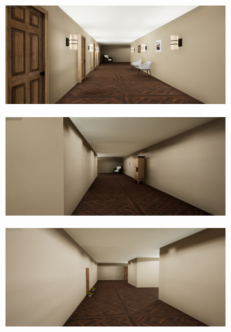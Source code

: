 \begin{figure}[H]
    \centering
    \begin{subfigure}[b]{0.48\textwidth}
        \centering
        \includegraphics[width=\textwidth]{resources/png/03/indoor-staircase/1.png}
        \vspace{0.25em}
    \end{subfigure}
    \hfill
    \begin{subfigure}[b]{0.48\textwidth}
        \centering
        \includegraphics[width=\textwidth]{resources/png/03/indoor-staircase/2.png}
        \vspace{0.25em}
    \end{subfigure}
    \begin{subfigure}[b]{0.48\textwidth}
        \centering
        \includegraphics[width=\textwidth]{resources/png/03/indoor-staircase/3.png}

\end{subfigure}
\end{figure}
